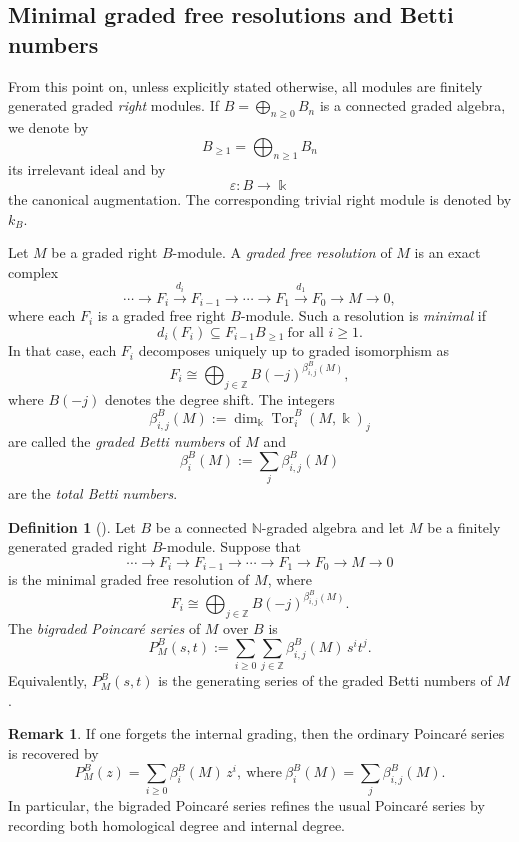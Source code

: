 \documentclass[reqno]{amsart}
\numberwithin{equation}{section}
\theoremstyle{definition}
\newtheorem{definition}[theorem]{Definition}
\newtheorem{remark}[theorem]{Remark}
\begin{document}
\subsection{Minimal graded free resolutions and Betti numbers}

From this point on, unless explicitly stated otherwise, all modules are finitely generated graded \emph{right} modules. If \(B=\bigoplus_{n\ge 0}B_n\) is a connected graded algebra, we denote by
\[
B_{\ge 1}=\bigoplus_{n\ge 1}B_n
\]
its irrelevant ideal and by
\[
\varepsilon:B\to \Bbbk
\]
the canonical augmentation. The corresponding trivial right module is denoted by \(k_B\).

Let \(M\) be a graded right \(B\)-module. A \emph{graded free resolution} of \(M\) is an exact complex
\[
\cdots\longrightarrow F_i\xrightarrow{d_i}F_{i-1}\longrightarrow \cdots \longrightarrow F_1\xrightarrow{d_1}F_0\longrightarrow M\longrightarrow 0,
\]
where each \(F_i\) is a graded free right \(B\)-module. Such a resolution is \emph{minimal} if
\[
d_i(F_i)\subseteq F_{i-1}B_{\ge 1}
\ \text{for all } i\ge 1.
\]
In that case, each \(F_i\) decomposes uniquely up to graded isomorphism as
\[
F_i\cong \bigoplus_{j\in\mathbb{Z}} B(-j)^{\beta_{i,j}^B(M)},
\]
where \(B(-j)\) denotes the degree shift. The integers
\[
\beta_{i,j}^B(M):=\dim_{\Bbbk}\operatorname{Tor}_i^B(M,\Bbbk)_j
\]
are called the \emph{graded Betti numbers} of \(M\) and
\[
\beta_i^B(M):=\sum_j \beta_{i,j}^B(M)
\]
are the \emph{total Betti numbers}.

\begin{definition}[{\cite[Chs.~11--12]{Peeva2011}}]
Let \(B\) be a connected \(\mathbb{N}\)-graded algebra and let \(M\) be a finitely generated graded right \(B\)-module. Suppose that
\[
\cdots \longrightarrow F_i \longrightarrow F_{i-1} \longrightarrow \cdots \longrightarrow F_1 \longrightarrow F_0 \longrightarrow M \longrightarrow 0
\]
is the minimal graded free resolution of \(M\), where
\[
F_i \cong \bigoplus_{j\in\mathbb{Z}} B(-j)^{\beta_{i,j}^B(M)}.
\]
The \emph{bigraded Poincar\'e series} of \(M\) over \(B\) is
\[
P_M^B(s,t):=\sum_{i\geq 0}\sum_{j\in\mathbb{Z}} \beta_{i,j}^B(M)\, s^i t^j.
\]
Equivalently, \(P_M^B(s,t)\) is the generating series of the graded Betti numbers of \(M\).
\end{definition}

\begin{remark}
If one forgets the internal grading, then the ordinary Poincar\'e series is recovered by
\[
P_M^B(z)=\sum_{i\geq 0}\beta_i^B(M)\, z^i,
\ \text{where}\
\beta_i^B(M)=\sum_j \beta_{i,j}^B(M).
\]
In particular, the bigraded Poincar\'e series refines the usual Poincar\'e series by recording both homological degree and internal degree.
\end{remark}
\end{document}
